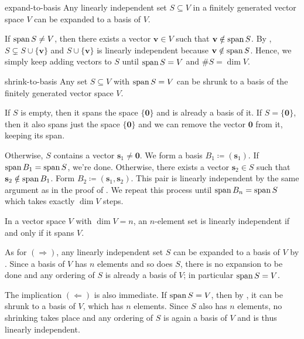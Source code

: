 \begin{corollary}{}{expand-to-basis}
 Any linearly independent set $S \subseteq V$ in a finitely generated vector
 space $V$ can be expanded to a basis of $V$.
\end{corollary}
\begin{corproof}
 If $\operatorname{span} S \neq V$, then there exists a vector $\mathbf{v} \in V$ such that
 $\mathbf{v} \notin \operatorname{span} S$. By , $S \subsetneq S
 \cup \{\mathbf{v}\}$ and $S \cup \{\mathbf{v}\}$ is linearly independent
 because $\mathbf{v} \notin \operatorname{span} S$. Hence, we simply keep adding vectors to $S$
 until $\operatorname{span} S = V$ and $\# S = \dim V$.
\end{corproof}

\begin{corollary}{}{shrink-to-basis}
 Any set $S \subseteq V$ with $\operatorname{span} S = V$ can be shrunk to a basis of the
 finitely generated vector space $V$.
\end{corollary}
\begin{corproof}
 If $S$ is empty, then it spans the space $\{\mathbf{0}\}$ and is already a
 basis of it. If $S = \{\mathbf{0}\}$, then it also spans just the space
 $\{\mathbf{0}\}$ and we can remove the vector $\mathbf{0}$ from it, keeping its
 span.

 Otherwise, $S$ contains a vector $\mathbf{s}_1 \neq \mathbf{0}$. We form a
 basis $B_1 \coloneqq (\mathbf{s}_1)$. If $\operatorname{span} B_1 = \operatorname{span} S$, we're done.
 Otherwise, there exists a vector $\mathbf{s}_2 \in S$ such that
 $\mathbf{s}_2 \notin \operatorname{span} B_1$. Form $B_2 \coloneqq
 (\mathbf{s}_1,\mathbf{s}_2)$. This pair is linearly independent by the same
 argument as in the proof of . We repeat
 this process until $\operatorname{span} B_n = \operatorname{span} S$ which takes exactly $\dim V$ steps.
\end{corproof}

\begin{corollary}{}{}
 In a vector space $V$ with $\dim V = n$, an $n$-element set is linearly
 independent if and only if it spans $V$.
\end{corollary}
\begin{corproof}
 As for $( \Rightarrow )$, any linearly independent set $S$ can be expanded to a
 basis of $V$ by . Since a basis of $V$
 has $n$ elements and so does $S$, there is no expansion to be done and any
 ordering of $S$ is already a basis of $V$; in particular $\operatorname{span} S = V$.

 The implication $( \Leftarrow )$ is also immediate. If $\operatorname{span} S = V$, then by
 , it can be shrunk to a basis of $V$,
 which has $n$ elements. Since $S$ also has $n$ elements, no shrinking takes
 place and any ordering of $S$ is again a basis of $V$ and is thus linearly
 independent.
\end{corproof}

